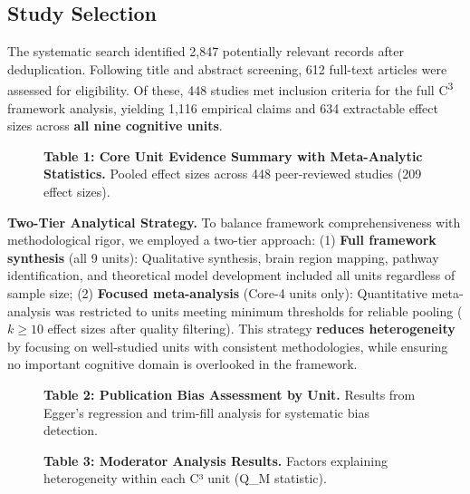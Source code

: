 \documentclass[9pt,onecolumn]{article}
\newcommand{\Cthree}{C\textsuperscript{3}}
\begin{document}
\subsection{Study Selection}

The systematic search identified 2,847 potentially relevant records after deduplication. Following title and abstract screening, 612 full-text articles were assessed for eligibility. Of these, 448 studies met inclusion criteria for the full \Cthree{} framework analysis, yielding 1,116 empirical claims and 634 extractable effect sizes across \textbf{all nine cognitive units}.

\begin{figure}[H]
\centering
\vspace{0.3em}
{\fontsize{7}{8.4}\selectfont\textbf{Table 1: Core Unit Evidence Summary with Meta-Analytic Statistics.} Pooled effect sizes across 448 peer-reviewed studies (209 effect sizes).}
\label{tab:core-evidence}
\end{figure}

\textbf{Two-Tier Analytical Strategy.} To balance framework comprehensiveness with methodological rigor, we employed a two-tier approach: (1) \textbf{Full framework synthesis} (all 9 units): Qualitative synthesis, brain region mapping, pathway identification, and theoretical model development included all units regardless of sample size; (2) \textbf{Focused meta-analysis} (Core-4 units only): Quantitative meta-analysis was restricted to units meeting minimum thresholds for reliable pooling ($k \geq 10$ effect sizes after quality filtering). This strategy \textbf{reduces heterogeneity} by focusing on well-studied units with consistent methodologies, while ensuring no important cognitive domain is overlooked in the framework.

\begin{figure}[H]
\centering
\vspace{0.3em}
{\fontsize{7}{8.4}\selectfont\textbf{Table 2: Publication Bias Assessment by Unit.} Results from Egger's regression and trim-fill analysis for systematic bias detection.}
\label{tab:publication-bias}
\end{figure}

\vspace{-0.3em}
\begin{figure}[H]
\centering
\vspace{0.2em}
{\fontsize{7}{8.4}\selectfont\textbf{Table 3: Moderator Analysis Results.} Factors explaining heterogeneity within each C³ unit (Q_M statistic).}
\label{tab:moderator-analysis}
\end{figure}
\end{document}

